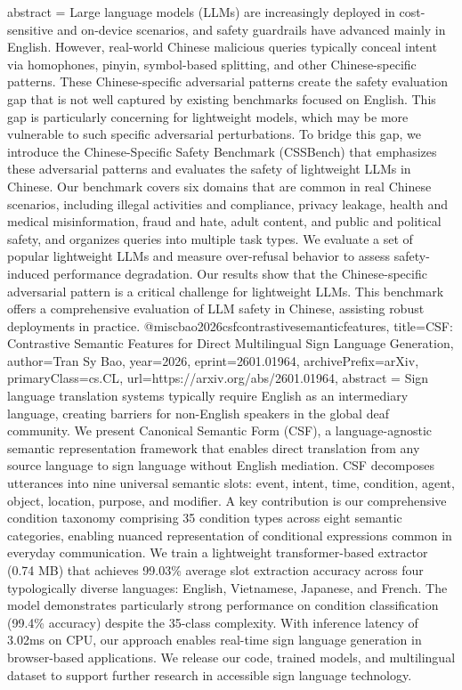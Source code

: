 {      abstract = {Large language models (LLMs) are increasingly deployed in cost-sensitive and on-device scenarios, and safety guardrails have advanced mainly in English. However, real-world Chinese malicious queries typically conceal intent via homophones, pinyin, symbol-based splitting, and other Chinese-specific patterns. These Chinese-specific adversarial patterns create the safety evaluation gap that is not well captured by existing benchmarks focused on English. This gap is particularly concerning for lightweight models, which may be more vulnerable to such specific adversarial perturbations. To bridge this gap, we introduce the Chinese-Specific Safety Benchmark (CSSBench) that emphasizes these adversarial patterns and evaluates the safety of lightweight LLMs in Chinese. Our benchmark covers six domains that are common in real Chinese scenarios, including illegal activities and compliance, privacy leakage, health and medical misinformation, fraud and hate, adult content, and public and political safety, and organizes queries into multiple task types. We evaluate a set of popular lightweight LLMs and measure over-refusal behavior to assess safety-induced performance degradation. Our results show that the Chinese-specific adversarial pattern is a critical challenge for lightweight LLMs. This benchmark offers a comprehensive evaluation of LLM safety in Chinese, assisting robust deployments in practice.}
}@misc{bao2026csfcontrastivesemanticfeatures,
      title={CSF: Contrastive Semantic Features for Direct Multilingual Sign Language Generation}, 
      author={Tran Sy Bao},
      year={2026},
      eprint={2601.01964},
      archivePrefix={arXiv},
      primaryClass={cs.CL},
      url={https://arxiv.org/abs/2601.01964},
      abstract = {Sign language translation systems typically require English as an intermediary language, creating barriers for non-English speakers in the global deaf community. We present Canonical Semantic Form (CSF), a language-agnostic semantic representation framework that enables direct translation from any source language to sign language without English mediation. CSF decomposes utterances into nine universal semantic slots: event, intent, time, condition, agent, object, location, purpose, and modifier. A key contribution is our comprehensive condition taxonomy comprising 35 condition types across eight semantic categories, enabling nuanced representation of conditional expressions common in everyday communication. We train a lightweight transformer-based extractor (0.74 MB) that achieves 99.03\% average slot extraction accuracy across four typologically diverse languages: English, Vietnamese, Japanese, and French. The model demonstrates particularly strong performance on condition classification (99.4\% accuracy) despite the 35-class complexity. With inference latency of 3.02ms on CPU, our approach enables real-time sign language generation in browser-based applications. We release our code, trained models, and multilingual dataset to support further research in accessible sign language technology.}
}
